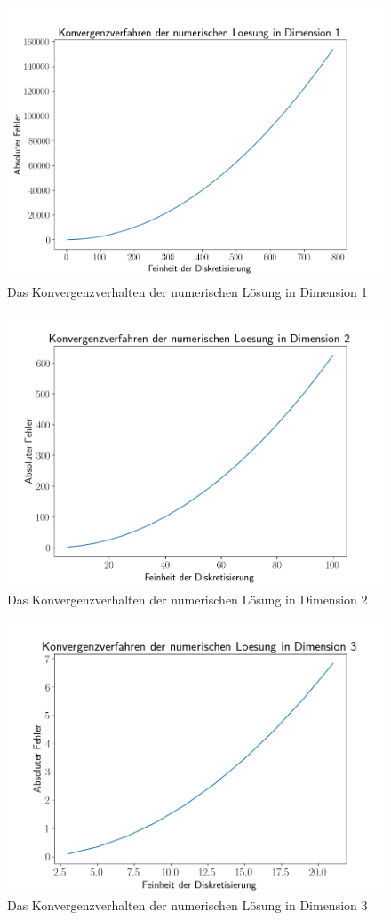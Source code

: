 \documentclass[smallheadings]{scrartcl}
\numberwithin{equation}{section}
\begin{document}
\begin{figure}
	\centering
	\includegraphics[width=0.7\linewidth]{Bericht/Bilder/konvdim1}
	\caption{Das Konvergenzverhalten der numerischen Lösung in Dimension 1}
	\label{fig:konvdim1}
\end{figure}

\begin{figure}
	\centering
	\includegraphics[width=0.7\linewidth]{Bericht/Bilder/konvdim2}
	\caption{Das Konvergenzverhalten der numerischen Lösung in Dimension 2}
	\label{fig:konvdim2}
\end{figure}

\begin{figure}
	\centering
	\includegraphics[width=0.7\linewidth]{Bericht/Bilder/konvdim3}
	\caption{Das Konvergenzverhalten der numerischen Lösung in Dimension 3}
	\label{fig:konvdim3}
\end{figure}
\end{document}
